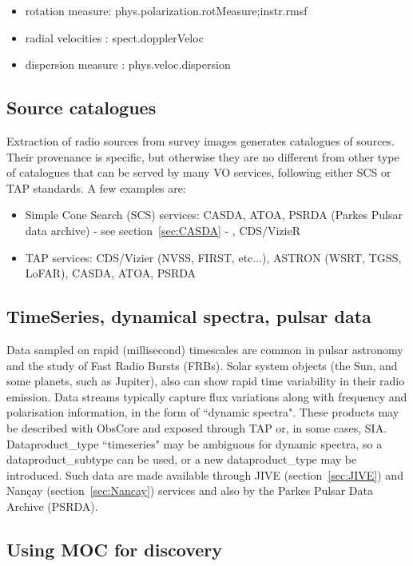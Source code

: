 \documentclass[11pt,a4paper]{ivoa}
\begin{document}
\begin{itemize}
    \item rotation measure: phys.polarization.rotMeasure;instr.rmsf
    \item radial velocities : spect.dopplerVeloc
    \item dispersion measure : phys.veloc.dispersion
\end{itemize}

\subsection{Source catalogues}
Extraction of radio sources from survey images generates catalogues of sources. Their provenance is specific, but otherwise they are no different from other type of catalogues that can be served by many VO services, following either SCS \citep{std:SCS} or TAP standards. A few examples are:
\begin{itemize}
\item Simple Cone Search (SCS) services: CASDA, ATOA, PSRDA (Parkes Pulsar data archive) - see section~\ref{sec:CASDA} - , CDS/VizieR
\item TAP services: CDS/Vizier (NVSS, FIRST, etc...), ASTRON (WSRT, TGSS, LoFAR), CASDA, ATOA, PSRDA 
\end{itemize}


\subsection{TimeSeries, dynamical spectra, pulsar data}

Data sampled on rapid (millisecond) timescales are common in pulsar astronomy and the study of Fast Radio Bursts (FRBs). 
Solar system objects (the Sun, and some planets, such as Jupiter), also can show rapid time variability in their radio emission. Data streams typically capture flux variations along with frequency and polarisation information, in the form of ``dynamic spectra".
These products may be described with ObsCore and exposed through TAP or, in some cases, SIA. Dataproduct\_type ``timeseries" may be ambiguous for dynamic spectra, so a dataproduct\_subtype can be used, or a new dataproduct\_type may be introduced. Such data are made available through JIVE (section~\ref{sec:JIVE}) and Nan\c cay (section~\ref{sec:Nancay}) services and also by the Parkes Pulsar Data Archive (PSRDA).


\subsection{Using MOC for discovery}
\end{document}
